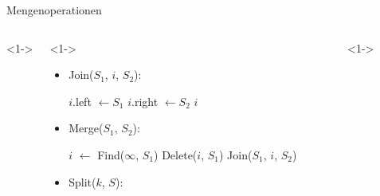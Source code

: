 \documentclass[t]{beamer}
\theoremstyle{plain}
\begin{document}
\begin{frame}{Mengenoperationen}
    \begin{columns}<1->
    \begin{column}{.65\textwidth}<1->
        \begin{itemize}
            \item<1> Join($S_1$, $i$, $S_2$):
                \begin{algorithm}[H]
                    $i$.left $\gets S_1$ \;
                    $i$.right $\gets S_2$ \;
                    \Return $i$
                \end{algorithm}
            \item<2> Merge($S_1$, $S_2$):
                \begin{algorithm}[H]
                    $i$ $\gets$ Find($\infty$, $S_1$) 
                    Delete($i$, $S_1$) \;
                    \Return Join($S_1$, $i$, $S_2$) \;
                \end{algorithm}
            \item<3> Split($k$, $S$):
                \begin{algorithm}[H]
                \end{algorithm}
        \end{itemize}
    \end{column}
    \begin{column}{.35\textwidth}<1->
    \end{column}
    \end{columns}
\end{frame}
\end{document}
